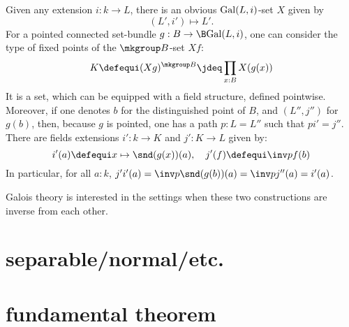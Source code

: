 Given any extension $i:k \to L$, there is an obvious $\mathrm{Gal}(L,i)$-set $X$ given by 
\begin{displaymath}
  (L',i') \mapsto L'.
\end{displaymath}
For a pointed connected set-bundle $g:B \to \B \Gal(L,i)$, one can consider the
type of fixed points of the $\mkgroup B$-set $Xf$:
\begin{displaymath}
  K \defequi (Xg)^{\mkgroup B} \jdeq \prod_{x:B}X(g(x))
\end{displaymath}
It is a set, which can be equipped with a field structure, defined pointwise.
Moreover, if one denotes $b$ for the distinguished point of $B$, and $(L'',j'')$ for $g(b)$, then, because $g$ is pointed, one has a path $p:L=L''$ such that $pi'=j''$. There are
fields extensions $i':k \to K$ and $j':K \to L$ given by:
\begin{displaymath}
  i'(a) \defequi x\mapsto \snd(g(x))(a),\quad
  j'(f) \defequi \inv p f(b)
\end{displaymath}
In particular, for all $a:k$, $j'i'(a) = \inv p \snd(g(b))(a) = \inv p j''(a) = i'(a)$.

Galois theory is interested in the settings when these two constructions are inverse from each other.

\section{separable/normal/etc.}
\label{sec:cover-spac-fields-1}

\section{fundamental theorem}
\label{sec:fundamental-theorem}



